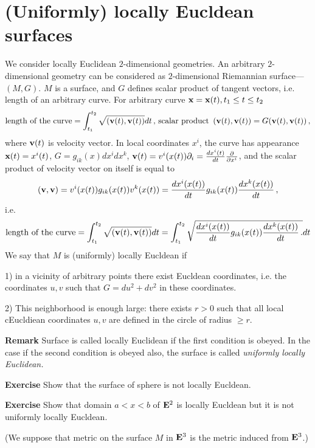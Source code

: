 \documentclass[12pt]{article}
\theoremstyle{definition}
\numberwithin{equation}{section}
\begin{document}
\tableofcontents

\section {(Uniformly) locally Eucldean surfaces}

  We consider locally Euclidean $2$-dimensional 
geometries.  An arbitrary $2$-dimensional  geometry 
can be considered as
$2$-dimensional  Riemannian surface---$(M,G)$.
$M$ is a surface, and $G$ defines scalar product of
tangent vectors, i.e. length of an arbitrary curve.
For arbitrary curve
  ${\bf x}={\bf x}(t), t_1\leq t\leq t_2$
             $$
 \hbox {length of the curve}=
   \int_{t_1}^{t_2} \sqrt{\left({\bf v}(t),{\bf v}(t)\right)}dt\,,\,
\hbox{scalar product}\,\,  
\left({\bf v}(t),{\bf v}(t)\right)=G({\bf v}(t),{\bf v}(t))\,, 
             $$
where ${\bf v}(t)$ is velocity vector. 
 In local coordinates $x^i$,
the curve has appearance  ${\bf x}(t)=x^i(t)$,
    $G=g_{ik}(x)dx^idx^k$,
  ${\bf v}(t)=v^i(x(t))\partial_i={dx^i(t)\over dt}{\partial\over \partial x^i}$,
and 
the scalar product of velocity vector on itself 
is equal to
      $$
\left({\bf v},{\bf v}\right)=
 v^i(x(t))g_{ik}(x(t))v^k(x(t))=
 {d x^i(x(t))\over dt}
   g_{ik}(x(t))
 {d x^k(x(t))\over dt}\,,
      $$
i.e.
      $$
 \hbox {length of the curve}=
   \int_{t_1}^{t_2} \sqrt{\left({\bf v}(t),{\bf v}(t)\right)}dt
      =
    \int_{t_1}^{t_2} \sqrt{
  {d x^i(x(t))\over dt}
   g_{ik}(x(t))
 {d x^k(x(t))\over dt} \,.   
             }dt
      $$
We say that $M$ is (uniformly) locally Eucldean
if

1) in a vicinity of arbitrary points there exist
 Eucldean coordinates, i.e. the coordinates  $u,v$
such that  $G=du^2+dv^2$ in these coordinates.


2) This  neighborhood is enough large:
there exists $r>0$ such that 
   all local cEucldiean coordinates  $u,v$ are defined in
the circle of radius $\geq r$.


{\bf Remark} 
  Surface is called locally Euclidean if the first condition
is obeyed. In the case if the second condition is
obeyed also, 
the surface is called {\it uniformly locally  Euclidean.}


\medskip

{\bf Exercise}  Show that the surface of sphere
is not locally Eucldean.


{\bf Exercise}  Show that domain $a<x<b$ of ${\bf E}^2$
is locally Eucldean but it is not uniformly 
locally Eucldean.

(We suppose that metric on the surface
$M$ in ${\bf E}^3$
is  the metric induced from ${\bf E}^3$.)
\end{document}
